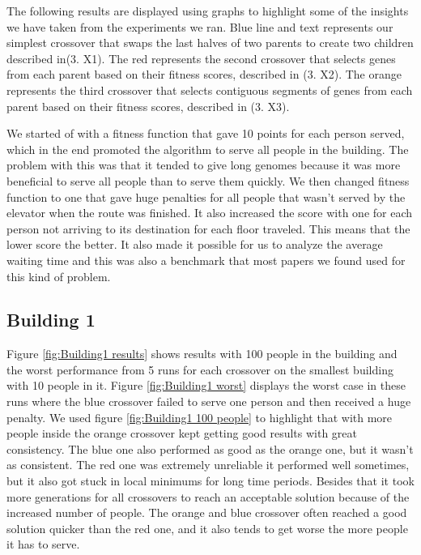 The following results are displayed using graphs to highlight some of the insights we have taken from the experiments we ran. Blue line and text represents our simplest crossover that swaps the last halves of two parents to create two children described in(3. X1). The red represents the second crossover that selects genes from each parent based on their fitness scores, described in (3. X2). The orange represents the third crossover that selects contiguous segments of genes from each parent based on their fitness scores, described in (3. X3).

We started of with a fitness function that gave 10 points for each person served, which in the end promoted the algorithm to serve all people in the building. The problem with this was that it tended to give long genomes because it was more beneficial to serve all people than to serve them quickly. We then changed fitness function to one that gave huge penalties for all people that wasn't served by the elevator when the route was finished. It also increased the score with one for each person not arriving to its destination for each floor traveled. This means that the lower score the better. It also made it possible for us to analyze the average waiting time and this was also a benchmark that most papers we found used for this kind of problem.

\newpage

\subsection{Building 1}
Figure \ref{fig:Building1 results} shows results with 100 people in the building and the worst performance from 5 runs for each crossover on the smallest building with 10 people in it. Figure \ref{fig:Building1 worst} displays the worst case in these runs where the blue crossover failed to serve one person and then received a huge penalty. We used figure \ref{fig:Building1 100 people} to highlight that with more people inside the orange crossover kept getting good results with great consistency. The blue one also performed as good as the orange one, but it wasn't as consistent. The red one was extremely unreliable it performed well sometimes, but it also got stuck in local minimums for long time periods. Besides that it took more generations for all crossovers to reach an acceptable solution because of the increased number of people. The orange and blue crossover often reached a good solution quicker than the red one, and it also tends to get worse the more people it has to serve.

